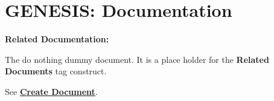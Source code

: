 \documentclass[12pt]{article}
\begin{document}
\section*{GENESIS: Documentation}

{\bf Related Documentation:}

\noindent The do nothing dummy document. It is a place holder for the {\bf Related Documents} tag construct.

See \href{../document-create/document-create.tex}{\bf Create Document}.
\end{document}
